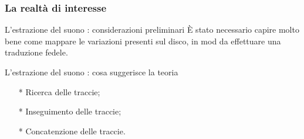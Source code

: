 \begin{frame}
\frametitle{La realtà di interesse}
\begin{block}{L'estrazione del suono : considerazioni preliminari}
\`E stato necessario capire molto bene come mappare le variazioni presenti
sul disco, in mod da effettuare una traduzione fedele.
\end{block}
\begin{block}{L'estrazione del suono : cosa suggerisce la teoria}
\begin{itemize}
\item[*] Ricerca delle traccie;
\item[*] Inseguimento delle traccie;
\item[*] Concatenzione delle traccie.
\end{itemize}
\end{block}
\end{frame}
